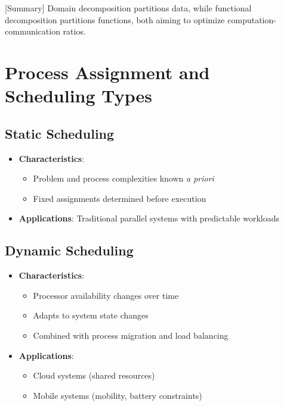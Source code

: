 \documentclass[12pt]{article}
\begin{document}
[Summary] Domain decomposition partitions data, while functional decomposition partitions functions, both aiming to optimize computation-communication ratios.

\section{Process Assignment and Scheduling Types}

\subsection{Static Scheduling}
\begin{itemize}
  \item \textbf{Characteristics}:
        \begin{itemize}
          \item Problem and process complexities known \textit{a priori}
          \item Fixed assignments determined before execution
        \end{itemize}

  \item \textbf{Applications}: Traditional parallel systems with predictable workloads
\end{itemize}

\subsection{Dynamic Scheduling}
\begin{itemize}
  \item \textbf{Characteristics}:
        \begin{itemize}
          \item Processor availability changes over time
          \item Adapts to system state changes
          \item Combined with process migration and load balancing
        \end{itemize}

  \item \textbf{Applications}:
        \begin{itemize}
          \item Cloud systems (shared resources)
          \item Mobile systems (mobility, battery constraints)
        \end{itemize}
\end{itemize}
\end{document}

